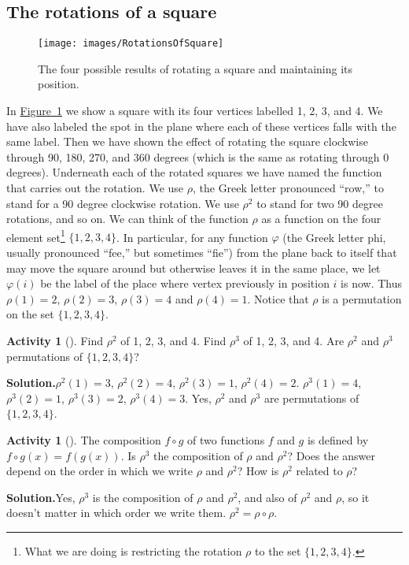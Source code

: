 \documentclass[10pt,]{book}
\theoremstyle{plain}
\theoremstyle{definition}
\newtheorem{activity}[project]{Activity}
\numberwithin{equation}{chapter}
\begin{document}
\subsection[{The rotations of a square}]{The rotations of a square}\label{subsection-57}
\leavevmode%
\begin{figure}
\centering
\texttt{[image: images/RotationsOfSquare]}
\caption{The four possible results of rotating a square and maintaining its position.\label{RotationsOfSquare}}
\end{figure}
In \hyperref[RotationsOfSquare]{Figure~\ref{RotationsOfSquare}} we show a square with its four vertices labelled 1, 2, 3, and 4. We have also labeled the spot in the plane where each of these vertices falls with the same label. Then we have shown the effect of rotating the square clockwise through 90, 180, 270, and 360 degrees (which is the same as rotating through 0 degrees). Underneath each of the rotated squares we have named the function that carries out the rotation. We use \(\rho\), the Greek letter pronounced ``row,'' to stand for a 90 degree clockwise rotation. We use \(\rho^2\) to stand for two 90 degree rotations, and so on. We can think of the function \(\rho\) as a function on the four element set\footnote{What we are doing is restricting the rotation \(\rho\) to the set \(\{1,2,3,4\}\).\label{fn-17}} \(\{1,2,3,4\}\). In particular, for any function \(\varphi\) (the Greek letter phi, usually pronounced ``fee,'' but sometimes ``fie'') from the plane back to itself that may move the square around but otherwise leaves it in the same place, we let \(\varphi(i)\) be the label of the place where vertex previously in position \(i\) is now. Thus \(\rho(1) =2\), \(\rho(2)=3\), \(\rho(3)=4\) and \(\rho(4) =1\). Notice that \(\rho\) is a permutation on the set \(\{1,2,3,4\}\).%
\begin{activity}[]\label{activity-234}
Find \(\rho^2\) of 1, 2, 3, and 4. Find \(\rho^3\) of 1, 2, 3, and 4. Are \(\rho^2\) and \(\rho^3\) permutations of \(\{1,2,3,4\}\)?%
\par\medskip\noindent%
\textbf{Solution.}\quad \(\rho^2(1)=3\), \(\rho^2(2)=4\), \(\rho^2(3)=1\), \(\rho^2(4) =2\). \(\rho^3(1)=4\), \(\rho^3(2)=1\), \(\rho^3(3)=2\), \(\rho^3(4)=3\). Yes, \(\rho^2\) and \(\rho^3\) are permutations of \(\{1,2,3,4\}\).%
\end{activity}
\begin{activity}[]\label{composition1}
The composition \(f\circ g\) of two functions \(f\) and \(g\) is defined by \(f\circ g(x) = f(g(x))\). Is \(\rho^3\) the composition of \(\rho\) and \(\rho^2\)? Does the answer depend on the order in which we write \(\rho\) and \(\rho^2\)? How is \(\rho^2\) related to \(\rho\)?%
\par\medskip\noindent%
\textbf{Solution.}\quad Yes, \(\rho^3\) is the composition of \(\rho\) and \(\rho^2\), and also of \(\rho^2\) and \(\rho\), so it doesn't matter in which order we write them. \(\rho^2=\rho\circ\rho\).%
\end{activity}
\end{document}

